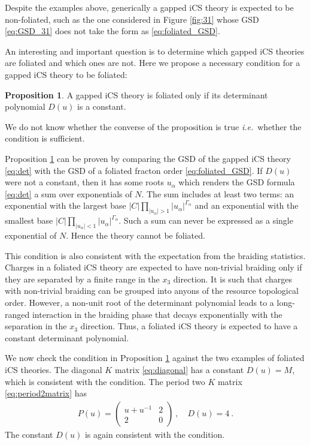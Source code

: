 \documentclass[aps,prb,twocolumn,superscriptaddress,floatfix,10pt,nofootinbib]{revtex4-2}
\newcommand{\ie}{\begin{equation}\begin{aligned}}
\newcommand{\fe}{\end{aligned}\end{equation}}
\theoremstyle{definition}
\newtheorem{proposition}[definition]{Proposition}
\begin{document}
Despite the examples above, generically a gapped iCS theory is expected to be non-foliated, such as the one considered in Figure \ref{fig:31} whose GSD \eqref{eq:GSD_31} does not take the form as \eqref{eq:foliated_GSD}. 

An interesting and important question is to determine which gapped iCS theories are foliated and which ones are not. 
Here we propose a necessary condition for a gapped iCS theory to be foliated:
\begin{proposition}\label{prop:foliation}
    A gapped iCS theory is foliated only if its determinant polynomial $D(u)$ is a constant.
\end{proposition}
\noindent 
We do not know whether the converse of the proposition is true \textit{i.e.}\ whether the condition is sufficient. 

Proposition \ref{prop:foliation} can be proven by comparing the GSD of the gapped iCS theory \eqref{eq:det} with the GSD of a foliated fracton order \eqref{eq:foliated_GSD}. If $D(u)$ were not a constant, then it has some roots $u_\alpha$ which renders the GSD formula \eqref{eq:det} a sum over exponentials of $N$. The sum includes at least two terms: an exponential with the largest base $|C|\prod_{|u_\alpha|>1}|u_\alpha|^{\Gamma_\alpha}$ and an exponential with the smallest base $|C|\prod_{|u_\alpha|<1}|u_\alpha|^{\Gamma_\alpha}$. Such a sum can never be expressed as a single exponential of $N$. Hence the theory cannot be foliated.



This condition is also consistent with the expectation from the braiding statistics. Charges in a foliated iCS theory are expected to have non-trivial braiding only if they are separated by a finite range in the $x_3$ direction. It is such that charges with non-trivial braiding can be grouped into anyons of the resource topological order. 
However, a non-unit root of the determinant polynomial leads to a long-ranged interaction in the braiding phase that decays exponentially with the separation in the $x_3$ direction.
Thus, a foliated iCS theory is expected to have a constant determinant polynomial.


We now check the condition in Proposition \ref{prop:foliation} against the two examples of foliated iCS theories. The diagonal $K$ matrix \eqref{eq:diagonal} has a constant $D(u)=M$, which is consistent with the condition.
The period two $K$ matrix \eqref{eq:period2matrix} has
\ie
P(u)=
\left(\begin{array}{cc}
    u+u^{-1} & 2 \\
    2 & 0
\end{array}\right)~,\quad D(u)=4~.
\fe
The constant $D(u)$ is again consistent with the condition.
\end{document}
